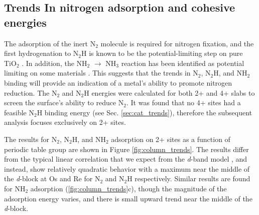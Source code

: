 \subsection{Trends In nitrogen adsorption and cohesive energies}
\label{sec:reactivity}

The adsorption of the inert N$_2$ molecule is required for nitrogen fixation, and the first hydrogenation to N$_2$H is known to be the potential-limiting step on pure TiO$_2$ \cite{Comer_2018}. In addition, the NH$_2$ $\rightarrow$ NH$_3$ reaction has been identified as potential limiting on some materials \cite{Hoskuldsson_2017}. This suggests that the trends in N$_2$, N$_2$H, and NH$_2$ binding will provide an indication of a metal's ability to promote nitrogen reduction. The N$_2$ and N$_2$H energies were calculated for both 2+ and 4+ slabs to screen the surface's ability to reduce N$_2$. It was found that no 4+ sites had a feasible N$_2$H binding energy (see Sec. \ref{sec:cat_trends}), therefore the subsequent analysis focuses exclusively on 2+ sites.

The results for N$_2$, N$_2$H, and NH$_2$ adsorption on 2+ sites as a function of periodic table group are shown in Figure \ref{fig:column_trends}. The results differ from the typical linear correlation that we expect from the \textit{d}-band model \cite{Nilsson_2008}, and instead, show relatively quadratic behavior with a maximum near the middle of the \textit{d}-block at Os and Re  for N$_2$ and N$_2$H respectively. Similar results are found for NH$_2$ adsorption (\ref{fig:column_trends}c), though the magnitude of the adsorption energy varies, and there is small upward trend near the middle of the \textit{d}-block. 


